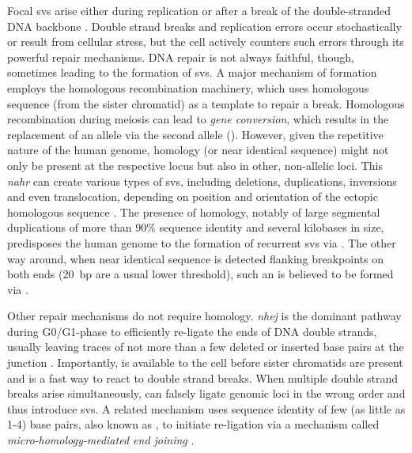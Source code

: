 Focal \acp{sv} arise either during replication or after a break of the
double-stranded DNA backbone \citep{Hastings2009}. Double strand breaks and
replication errors occur stochastically or result from cellular stress, but the
cell actively counters such errors through its powerful repair mechanisms. DNA
repair is not always faithful, though, sometimes leading to the formation of
\acp{sv}. A major mechanism of \sv formation employs the homologous
recombination machinery, which uses homologous sequence (from the sister
chromatid) as a template to repair a break. Homologous recombination during
meiosis can lead to \emph{gene conversion}, which results in the replacement of
an allele via the second allele (\loh). However, given the repetitive nature of
the human genome, homology (or near identical sequence) might not only be present at the
respective locus but also in other, non-allelic loci. This \emph{\acf{nahr}}
can create various types of \acp{sv}, including deletions, duplications,
inversions and even translocation, depending on position and orientation of the
ectopic homologous sequence \citep{Carvalho2016}. The presence of homology,
notably of large segmental duplications of more than 90\% sequence identity and
several kilobases in size, predisposes the human genome to the formation of
recurrent \acp{sv} via \nahr \citep{Carvalho2016}. The other way around, when
near identical sequence is detected flanking \sv breakpoints on both ends
(20~bp are a usual lower threshold), such an \sv is believed to be formed via
\nahr \citep{Onishi-Seebacher2011}.

Other repair mechanisms do not require homology. \emph{\Acf{nhej}} is the
dominant pathway during G0/G1-phase to efficiently re-ligate the ends of DNA
double strands, usually leaving traces of not more than a few deleted or
inserted base pairs at the junction \citep{Lieber2008}. Importantly, \nhej is
available to the cell before sister chromatids are present and is a fast way to
react to double strand breaks. When multiple double strand breaks arise
simultaneously, \nhej can falsely ligate genomic loci in the wrong order and
thus introduce \acp{sv}. A related mechanism uses sequence identity of few
(as little as 1-4) base pairs, also known as , to initiate re-ligation via a
mechanism called \emph{micro-homology-mediated end joining} \citep{Hastings2009}.


